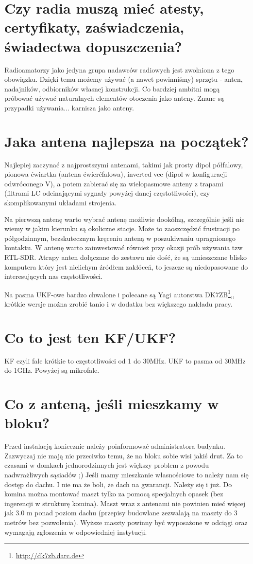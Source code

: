 \documentclass[a4paper,12pt]{article}
\begin{document}
\section{Czy radia muszą mieć atesty, certyfikaty, zaświadczenia, świadectwa dopuszczenia?}
Radioamatorzy jako jedyna grupa nadawców radiowych jest zwolniona z tego obowiązku. Dzięki temu możemy używać (a nawet powinniśmy) sprzętu - anten, nadajników, odbiorników własnej konstrukcji. Co bardziej ambitni mogą próbować używać naturalnych elementów otoczenia jako anteny. Znane są przypadki używania... karnisza jako anteny.

\section{Jaka antena najlepsza na początek?}
Najlepiej zaczynać z najprostszymi antenami, takimi jak prosty dipol półfalowy, pionowa ćwiartka (antena ćwierćfalowa), inverted vee (dipol w konfiguracji odwróconego V), a potem zabierać się za wielopasmowe anteny z trapami (filtrami LC odcinającymi sygnały powyżej danej częstotliwości), czy skomplikowanymi układami strojenia.

Na pierwszą antenę warto wybrać antenę możliwie dookólną, szczególnie jeśli nie wiemy w jakim kierunku są okoliczne stacje. Może to zaoszczędzić frustracji po półgodzinnym, bezskutecznym kręceniu anteną w poszukiwaniu upragnionego kontaktu.
W antenę warto zainwestować również przy okazji prób używania tzw RTL-SDR. Atrapy anten dołączane do zestawu nie dość, że są umieszczane blisko komputera który jest nielichym źródłem zakłóceń, to jeszcze są niedopasowane do interesujących nas częstotliwości.

Na pasma UKF-owe bardzo chwalone i polecane są Yagi autorstwa DK7ZB\footnote{\url{http://dk7zb.darc.de}},, krótkie wersje można zrobić tanio i w dodatku bez większego nakładu pracy.

\section{Co to jest ten KF/UKF?}
KF czyli fale krótkie to częstotliwości od 1 do 30MHz.
UKF to pasma od 30MHz do 1GHz.
Powyżej są mikrofale.

\section{Co z anteną, jeśli mieszkamy w bloku?}
Przed instalacją koniecznie należy poinformować administratora budynku. Zazwyczaj nie mają nic przeciwko temu, że na bloku sobie wisi jakiś drut. Za to czasami w domkach jednorodzinnych jest większy problem z powodu nadwrażliwych sąsiadów ;)
Jeśli mamy mieszkanie własnościowe to należy nam się dostęp do dachu. I nie ma że boli, że dach na gwarancji. Należy się i już.
Do komina można montować maszt tylko za pomocą specjalnych opasek (bez ingerencji w strukturę komina). Maszt wraz z antenami nie powinien mieć więcej jak 3.0 m ponad poziom dachu (przepisy budowlane zezwalają na maszty do 3 metrów bez pozwolenia). Wyższe maszty powinny być wyposażone w odciągi oraz wymagają zgłoszenia w odpowiedniej instytucji.
\end{document}
